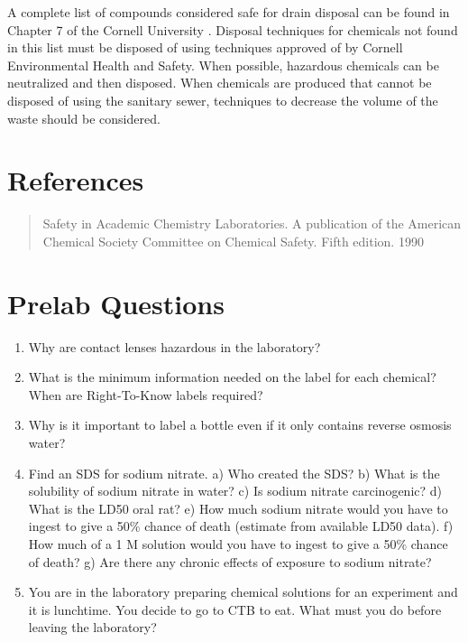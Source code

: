 \documentclass[letterpaper,10pt,english]{sphinxmanual}
\begin{document}
A complete list of compounds considered safe for drain disposal can be found in Chapter 7 of the Cornell University .  Disposal techniques for chemicals not found in this list must be disposed of using techniques approved of by Cornell Environmental Health and Safety. When possible, hazardous chemicals can be neutralized and then disposed. When chemicals are produced that cannot be disposed of using the sanitary sewer, techniques to decrease the volume of the waste should be considered.


\section{References}
\label{\detokenize{Laboratory_Safety/Laboratory_Safety:references}}\label{\detokenize{Laboratory_Safety/Laboratory_Safety:heading-laboratory-safety-references}}\begin{quote}

Safety in Academic Chemistry Laboratories. A publication of the American Chemical Society Committee on Chemical Safety. Fifth edition. 1990
\end{quote}


\section{Prelab Questions}
\label{\detokenize{Laboratory_Safety/Laboratory_Safety:prelab-questions}}\begin{enumerate}
\item {} 
Why are contact lenses hazardous in the laboratory?

\item {} 
What is the minimum information needed on the label for each chemical? When are Right-To-Know labels required?

\item {} 
Why is it important to label a bottle even if it only contains reverse osmosis water?

\item {} 
Find an SDS for sodium nitrate.  a) Who created the SDS? b) What is the solubility of sodium nitrate in water? c) Is sodium nitrate carcinogenic? d) What is the LD50 oral rat? e) How much sodium nitrate would you have to ingest to give a 50\% chance of death (estimate from available LD50 data). f) How much of a 1 M solution would you have to ingest to give a 50\% chance of death? g) Are there any chronic effects of exposure to sodium nitrate?

\item {} 
You are in the laboratory preparing chemical solutions for an experiment and it is lunchtime. You decide to go to CTB to eat. What must you do before leaving the laboratory?

\end{enumerate}
\end{document}
